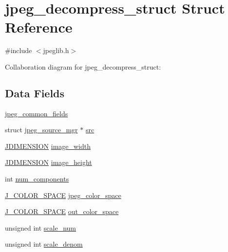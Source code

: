 \hypertarget{structjpeg__decompress__struct}{}\section{jpeg\+\_\+decompress\+\_\+struct Struct Reference}
\label{structjpeg__decompress__struct}


{\ttfamily \#include $<$jpeglib.\+h$>$}



Collaboration diagram for jpeg\+\_\+decompress\+\_\+struct\+:
\subsection*{Data Fields}
\begin{DoxyCompactItemize}
\item 
\hyperlink{structjpeg__decompress__struct_a62d872add9f188d06908d327da2a24fd}{jpeg\+\_\+common\+\_\+fields}
\item 
struct \hyperlink{structjpeg__source__mgr}{jpeg\+\_\+source\+\_\+mgr} $\ast$ \hyperlink{structjpeg__decompress__struct_aa0f9a673100231cfd81f17b789784785}{src}
\item 
\hyperlink{jmorecfg_8h_a04ed4674f6f1d0d50ec241531e38274f}{J\+D\+I\+M\+E\+N\+S\+I\+ON} \hyperlink{structjpeg__decompress__struct_a433c0a54f42dfd3d2977ea967b9a21ee}{image\+\_\+width}
\item 
\hyperlink{jmorecfg_8h_a04ed4674f6f1d0d50ec241531e38274f}{J\+D\+I\+M\+E\+N\+S\+I\+ON} \hyperlink{structjpeg__decompress__struct_ad711fae8063a3e75e3c0cccd8512bedf}{image\+\_\+height}
\item 
int \hyperlink{structjpeg__decompress__struct_a15d5e8c34e5c66983eda5c0070f0be95}{num\+\_\+components}
\item 
\hyperlink{jpeglib_8h_a6ea40239360b06efe6377f125f1134f3}{J\+\_\+\+C\+O\+L\+O\+R\+\_\+\+S\+P\+A\+CE} \hyperlink{structjpeg__decompress__struct_a980b92cd751cbc72cc7edd1f9ef2c3e4}{jpeg\+\_\+color\+\_\+space}
\item 
\hyperlink{jpeglib_8h_a6ea40239360b06efe6377f125f1134f3}{J\+\_\+\+C\+O\+L\+O\+R\+\_\+\+S\+P\+A\+CE} \hyperlink{structjpeg__decompress__struct_a4e69e870df7b81671043374d01efc14f}{out\+\_\+color\+\_\+space}
\item 
unsigned int \hyperlink{structjpeg__decompress__struct_a6c87b02686e69267d26e28c5d3775469}{scale\+\_\+num}
\item 
unsigned int \hyperlink{structjpeg__decompress__struct_ab2621a1694c2b2ea6cfb8618639e5995}{scale\+\_\+denom}

\end{DoxyCompactItemize}
